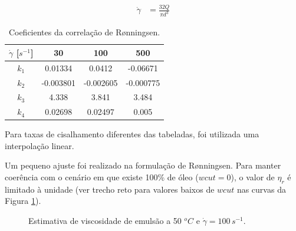 \documentclass[final,5p]{elsarticle}
\numberwithin{equation}{section}
\begin{document}
        \begin{align}
            \dot{\gamma} &= \frac{32 Q}{\pi d^3}
        \end{align}

        \begin{table}[ht]
            \centering
            \begin{tabular}{c|ccc}
                $\dot{\gamma}$ [$s^{-1}$] & 30 & 100 & 500 \\
                 \hline
                 $k_1$ & 0.01334 & 0.0412 & -0.06671 \\
                 $k_2$ & -0.003801 & -0.002605 & -0.000775 \\
                 $k_3$ & 4.338 & 3.841 & 3.484 \\
                 $k_4$ & 0.02698 & 0.02497 & 0.005 \\
            \end{tabular}
            \caption{Coeficientes da correlação de Rønningsen.}
            \label{tab:ronningsen}
        \end{table}

        Para taxas de cisalhamento diferentes das tabeladas, foi utilizada uma interpolação linear.

        Um pequeno ajuste foi realizado na formulação de Rønningsen. Para manter coerência com o cenário em que existe 100\% de óleo ($wcut=0$), o valor de $\eta_r$ é limitado à unidade (ver trecho reto para valores baixos de $wcut$ nas curvas da Figura \ref{fig:emulsao}).

        \begin{figure}[hbt!]
            \caption{Estimativa de viscosidade de emulsão a 50 $^oC$ e $\dot{\gamma} = 100\,s^{-1}$.}
            \label{fig:emulsao}
        \end{figure}
\end{document}

